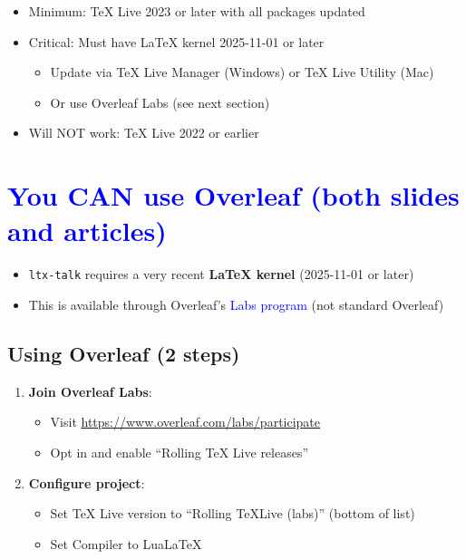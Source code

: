 \documentclass{article}
\newcommand\BlueText[1]{\textcolor{blue}{#1}}
\newcommand\RedText[1]{\textcolor{AccessibleRed}{#1}}
\newcommand\GreenText[1]{\textcolor{AccessibleGreen}{#1}}
\newcommand{\urlu}[1]{\uline{\url{#1}}}        %
\begin{document}
\begin{itemize}
\item \GreenText{Minimum:} TeX Live 2023 or later with all packages updated
\item \GreenText{Critical:} Must have LaTeX kernel 2025-11-01 or later
  \begin{itemize}
  \item Update via TeX Live Manager (Windows) or TeX Live Utility (Mac)
  \item Or use Overleaf Labs (see next section)
  \end{itemize}
\item \RedText{Will NOT work:} TeX Live 2022 or earlier
\end{itemize}

\section{\BlueText{You \textbf{CAN} use Overleaf (both slides and articles)}}

\begin{itemize}
\item \texttt{ltx-talk} requires a very recent \textbf{LaTeX kernel} (2025-11-01 or later)
\item This is available through Overleaf's \BlueText{Labs program} (not standard Overleaf)
\end{itemize}

\subsection{Using Overleaf (2 steps)}

\begin{enumerate}
\item \textbf{Join Overleaf Labs}: 
  \begin{itemize}
  \item Visit \urlu{https://www.overleaf.com/labs/participate}
  \item Opt in and enable ``Rolling TeX Live releases''
  \end{itemize}
\item \textbf{Configure project}:
  \begin{itemize}
  \item Set TeX Live version to \GreenText{``Rolling TeXLive (labs)''} (bottom of list)
  \item Set Compiler to \GreenText{LuaLaTeX}
  \end{itemize}
\end{enumerate}
\end{document}
